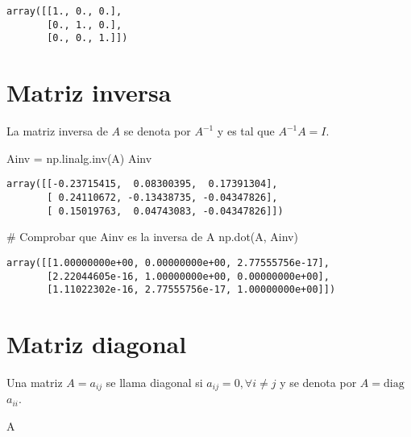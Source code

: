 \documentclass[
  letterpaper,
  DIV=11,
  numbers=noendperiod]{scrreprt}
\newenvironment{Shaded}{\begin{snugshade}}{\end{snugshade}}
\newcommand{\CommentTok}[1]{\textcolor[rgb]{0.37,0.37,0.37}{#1}}
\newcommand{\NormalTok}[1]{\textcolor[rgb]{0.00,0.23,0.31}{#1}}
\newcommand{\OperatorTok}[1]{\textcolor[rgb]{0.37,0.37,0.37}{#1}}
\begin{document}
\begin{verbatim}
array([[1., 0., 0.],
       [0., 1., 0.],
       [0., 0., 1.]])
\end{verbatim}

\section{Matriz inversa}\label{matriz-inversa}

La matriz inversa de \(A\) se denota por \(A^{-1}\) y es tal que
\(A^{-1}A = I\).

\begin{Shaded}
\begin{Highlighting}[]
\NormalTok{Ainv }\OperatorTok{=}\NormalTok{ np.linalg.inv(A)}
\NormalTok{Ainv}
\end{Highlighting}
\end{Shaded}

\begin{verbatim}
array([[-0.23715415,  0.08300395,  0.17391304],
       [ 0.24110672, -0.13438735, -0.04347826],
       [ 0.15019763,  0.04743083, -0.04347826]])
\end{verbatim}

\begin{Shaded}
\begin{Highlighting}[]
\CommentTok{\# Comprobar que Ainv es la inversa de A}
\NormalTok{np.dot(A, Ainv)}
\end{Highlighting}
\end{Shaded}

\begin{verbatim}
array([[1.00000000e+00, 0.00000000e+00, 2.77555756e-17],
       [2.22044605e-16, 1.00000000e+00, 0.00000000e+00],
       [1.11022302e-16, 2.77555756e-17, 1.00000000e+00]])
\end{verbatim}

\section{Matriz diagonal}\label{matriz-diagonal}

Una matriz \(A = {a_{ij}}\) se llama diagonal si
\(a_{ij}=0, \forall i \ne j\) y se denota por \(A = \mbox{diag}\)
\({a_{ii}}\).

\begin{Shaded}
\begin{Highlighting}[]
\NormalTok{A}
\end{Highlighting}
\end{Shaded}
\end{document}
